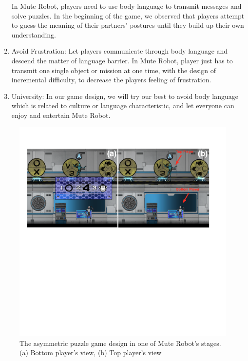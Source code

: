 \documentclass{sigchi}
\begin{document}
\begin{enumerate}
In Mute Robot, players need to use body language to transmit messages and solve puzzles. In the beginning of the game, we observed that players attempt to guess the meaning of their partners’ postures until they build up their own understanding. 
\item Avoid Frustration: 
Let players communicate through body language and descend the matter of language barrier. In Mute Robot, player just has to transmit one single object or mission at one time, with the design of incremental difficulty, to decrease the players feeling of frustration.
\item University: 
In our game design, we will try our best to avoid body language which is related to culture or language characteristic, and let everyone can enjoy and entertain Mute Robot.
\end{enumerate}


\begin{figure}[!h]
\centering
\includegraphics[width=1.0\columnwidth]{Figures/GD_F2.pdf}
\caption{The asymmetric puzzle game design in one of Mute Robot's stages. (a) Bottom player's view, (b) Top player's view}
\label{fig:GD_F2}
\end{figure}
\end{document}
